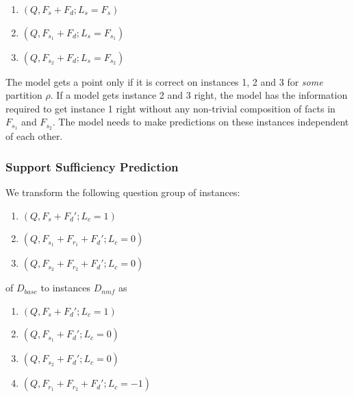 \begin{enumerate}[noitemsep]
    \item $(Q, F_s + F_d; L_s=F_s)$
    \item $(Q, F_{s_1} + F_d; L_s=F_{s_1})$
    \item $(Q, F_{s_2} + F_d; L_s=F_{s_2})$
\end{enumerate}

The model gets a point only if it is correct on instances 1, 2 and 3 for \emph{some} partition $\rho$.
If a model gets instance 2 and 3 right, the model has the information required to get instance 1 right without any non-trivial composition of facts in $F_{s_1}$ and $F_{s_2}$. The model needs to make predictions on these instances independent of each other.

\eat{
    
}

\subsubsection{Support Sufficiency Prediction}

We transform the following question group of instances:

\begin{enumerate}[noitemsep]
    \item $(Q, F_s + F_d'; L_c=1)$
    \item $(Q, F_{s_1} + F_{r_1} + F_d'; L_c=0)$
    \item $(Q, F_{s_2} + F_{r_2} + F_d'; L_c=0)$
\end{enumerate}

\noindent of $D_{base}$ to instances $D_{nmf}$ as

\begin{enumerate}[noitemsep]
    \item $(Q, F_s + F_d'; L_c=1)$
    \item $(Q, F_{s_1} + F_d'; L_c=0)$
    \item $(Q, F_{s_2} + F_d'; L_c=0)$
    \item $(Q, F_{r_1} + F_{r_2} + F_d'; L_c=-1)$
\end{enumerate}

